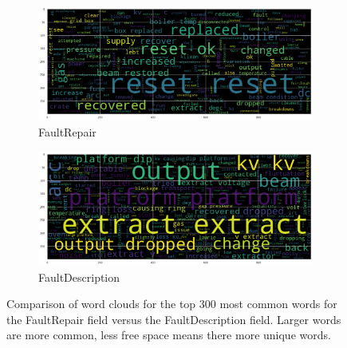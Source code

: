 \documentclass[10pt,oneside]{report}
\begin{document}
\begin{figure}[htbp]
    \centering
    \begin{subfigure}[b]{0.48\textwidth}
        \centering
        \includegraphics[width=\textwidth]{wcFaultRepairs.png}
        \caption{\fontsize{7}{8}\selectfont FaultRepair}
        \label{fig:wcFaultRepairs}
    \end{subfigure}%
    \hfill
    \begin{subfigure}[b]{0.48\textwidth}
        \centering
        \includegraphics[width=\textwidth]{wcFaultDescription.png}
        \caption{\fontsize{7}{8}\selectfont FaultDescription}
        \label{fig:wcFaultDescription}
    \end{subfigure}
    \caption{Comparison of word clouds for the top 300 most common words for the FaultRepair field versus the FaultDescription field. Larger words are more common, less free space means there more unique words.}
    \label{fig:wc}
\end{figure}
\end{document}
